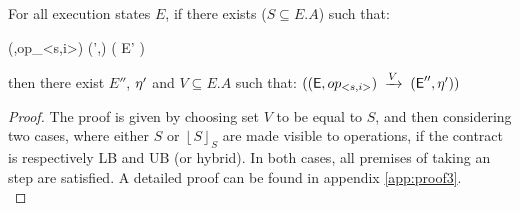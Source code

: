 %
%

\begin{theorem}
\label{theorem:three}
For all execution states $E$, if there
exists ($S\subseteq E.A$) such that: 
\begin{smathpar}
 {(\E,op_{<s,i>})} {} {(\E',\eff)} \spc \wedge \spc ( \psi {} E' )  
\end{smathpar}
then there exist  $E''$, $\eta'$ and $V\subseteq E.A$ such that:
$(({\normalfont \textsf{E}},op_{<s,i>})\;\xrightarrow{V}\;({\normalfont \textsf{E}}'',\eta'))$
\end{theorem}
\begin{proof}
The proof is given by choosing set $V$ to be equal to $S$, and then
considering two cases, where either $S$ or $\left \lfloor S \right
\rfloor_S$ are made visible to operations, if the contract is respectively
LB and UB (or hybrid). In both cases, all premises of taking an step
are satisfied.
A detailed proof can be found in appendix
\ref{app:proof3}.
\\
\end{proof}

